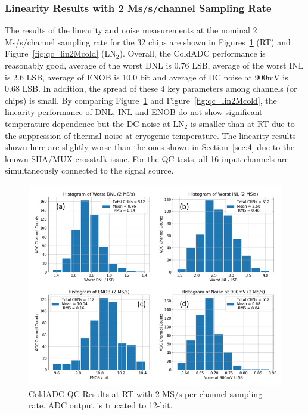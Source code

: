 \subsubsection{Linearity Results with 2 Ms/s/channel Sampling Rate}
The results of the linearity and noise measurements at the nominal 2 Ms/s/channel sampling rate for the 32 chips are shown in 
Figures~\ref{fig:qc_lin2Mwarm} (RT) and Figure~\ref{fig:qc_lin2Mcold} (LN$_2$). 
Overall, the ColdADC performance is reasonably good, average of the worst DNL is 0.76 LSB, average of the worst INL is 2.6 LSB, 
average of ENOB is 10.0 bit and average of DC noise at 900mV is 0.68 LSB. In addition, the spread of these 4 key parameters 
among channels (or chips) is small.
By comparing Figure~\ref{fig:qc_lin2Mwarm} and Figure~\ref{fig:qc_lin2Mcold}, the linearity  performance of DNL, INL and ENOB 
do not show significant temperature dependence but the DC noise at LN$_2$ is smaller than at RT due to the suppression of 
thermal noise at cryogenic temperature.  
The linearity results shown here are slightly worse than the ones shown in Section~\ref{sec:4} due to the known SHA/MUX crosstalk issue.
For the QC tests, all 16 input channels are simultaneously connected to the signal source.
\begin{figure}[h!]
\centering
  \includegraphics[width=0.85\linewidth]{figures/qc_lin2Mwarm.png}
  \caption{ColdADC QC Results at RT with 2 MS/s per channel sampling rate. ADC output is trucated to 12-bit.}
  \label{fig:qc_lin2Mwarm}
\end{figure}
